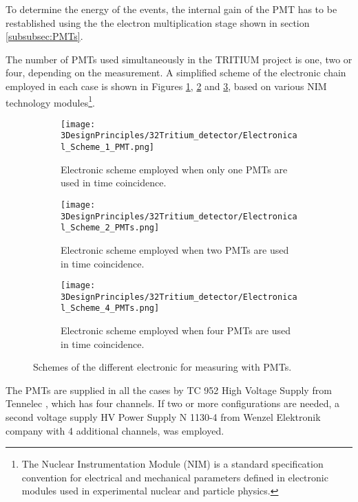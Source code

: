 To determine the energy of the events, the internal gain of the PMT has to be restablished using the the electron multiplication stage shown in section \ref{subsubsec:PMTs}. 

The number of PMTs used simultaneously in the TRITIUM project is one, two or four, depending on the measurement. A simplified scheme of the electronic chain employed in each case is shown in Figures \ref{subfig:ElectronicConfiguraiton1PMT}, \ref{subfig:ElectronicConfiguraiton2PMT} and \ref{subfig:ElectronicConfiguraiton4PMT}, based on various NIM technology modules\footnote{The Nuclear Instrumentation Module (NIM) is a standard specification convention for electrical and mechanical parameters defined in electronic modules used in experimental nuclear and particle physics.}.

\begin{figure}
\centering
    \begin{subfigure}[b]{1.0\textwidth}
    \centering
    \texttt{[image: 3DesignPrinciples/32Tritium\_detector/Electronical\_Scheme\_1\_PMT.png]}  
    \caption{Electronic scheme employed when only one PMTs are used in time coincidence.\label{subfig:ElectronicConfiguraiton1PMT}}
    \end{subfigure}
    \hfill
    \begin{subfigure}[b]{1.0\textwidth}
    \centering
    \texttt{[image: 3DesignPrinciples/32Tritium\_detector/Electronical\_Scheme\_2\_PMTs.png]}  
    \caption{Electronic scheme employed when two PMTs are used in time coincidence.\label{subfig:ElectronicConfiguraiton2PMT}}
    \end{subfigure}
    \hfill
    \begin{subfigure}[b]{1.0\textwidth}
    \centering
    \texttt{[image: 3DesignPrinciples/32Tritium\_detector/Electronical\_Scheme\_4\_PMTs.png]}  
    \caption{Electronic scheme employed when four PMTs are used in time coincidence.\label{subfig:ElectronicConfiguraiton4PMT}}
    \end{subfigure}
 \caption{Schemes of the different electronic for measuring with PMTs.}
 \label{fig:ElectronicConfiguraitonsPMT}
\end{figure}

The PMTs are supplied in all the cases by TC 952 High Voltage Supply from Tennelec \cite{DataSheetHVSupplyTennelec}, which has four channels. If two or more configurations are needed, a second voltage supply HV Power Supply N 1130-4 from Wenzel Elektronik company \cite{DataSheetHVSupplyWenzel} with 4 additional channels, was employed. 

